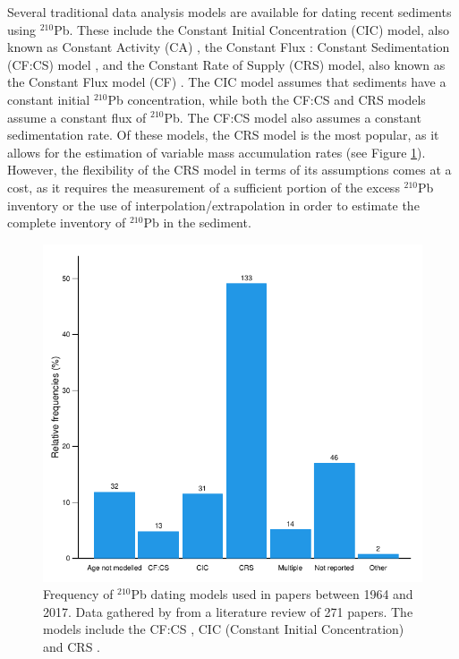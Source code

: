 \documentclass [10pt] {article}
\begin{document}
Several traditional data analysis models are available for dating recent sediments using $^{210}$Pb. These include the Constant Initial Concentration (CIC) model, also known as Constant Activity (CA) \citep{Goldberg1963, Robbins1975}, the Constant Flux : Constant Sedimentation (CF:CS) model \citep{Crozaz1964}, and the Constant Rate of Supply (CRS) model, also known as the Constant Flux model (CF) \citep{Appleby1978, Robbins1978, Sanchez-Cabeza2012}. The CIC model assumes that sediments have a constant initial $^{210}$Pb concentration, while both the CF:CS and CRS models assume a constant flux of $^{210}$Pb. The CF:CS model also assumes a constant sedimentation rate. Of these models, the CRS model is the most popular, as it allows for the estimation of variable mass accumulation rates (see Figure \ref{fig:210models}). However, the flexibility of the CRS model in terms of its assumptions comes at a cost, as it requires the measurement of a sufficient portion of the excess $^{210}$Pb inventory or the use of interpolation/extrapolation in order to estimate the complete inventory of $^{210}$Pb in the sediment.



\begin{figure}[h!]
	\begin{centering}
		\includegraphics[width=.75\linewidth]{barras.pdf}
		\caption{Frequency of $^{210}$Pb dating models used in papers between 1964 and 2017. Data gathered by \citet{Courtney2019} from a literature review of 271 papers. The models include the CF:CS \citep[Constant Flux - Constant Sedimentation;][]{Robbins1978}, CIC (Constant Initial Concentration) \citep{Goldberg1963,Crozaz1964,Robbins1978} and CRS  \citep[Constant Rate of Supply;][]{Appleby1978,Robbins1978}. }
		\label{fig:210models}
	\end{centering}
\end{figure}
\end{document}
